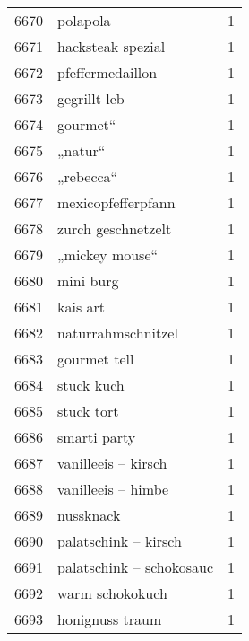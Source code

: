 \begin{tabular}{llr}
6670 &                                           polapola &      1 \\
6671 &                                  hacksteak spezial &      1 \\
6672 &                                   pfeffermedaillon &      1 \\
6673 &                                       gegrillt leb &      1 \\
6674 &                                           gourmet“ &      1 \\
6675 &                                            „natur“ &      1 \\
6676 &                                          „rebecca“ &      1 \\
6677 &                                 mexicopfefferpfann &      1 \\
6678 &                                 zurch geschnetzelt &      1 \\
6679 &                                     „mickey mouse“ &      1 \\
6680 &                                          mini burg &      1 \\
6681 &                                           kais art &      1 \\
6682 &                                 naturrahmschnitzel &      1 \\
6683 &                                       gourmet tell &      1 \\
6684 &                                         stuck kuch &      1 \\
6685 &                                         stuck tort &      1 \\
6686 &                                       smarti party &      1 \\
6687 &                                vanilleeis – kirsch &      1 \\
6688 &                                 vanilleeis – himbe &      1 \\
6689 &                                          nussknack &      1 \\
6690 &                               palatschink – kirsch &      1 \\
6691 &                           palatschink – schokosauc &      1 \\
6692 &                                    warm schokokuch &      1 \\
6693 &                                    honignuss traum &      1 \\

\end{tabular}

